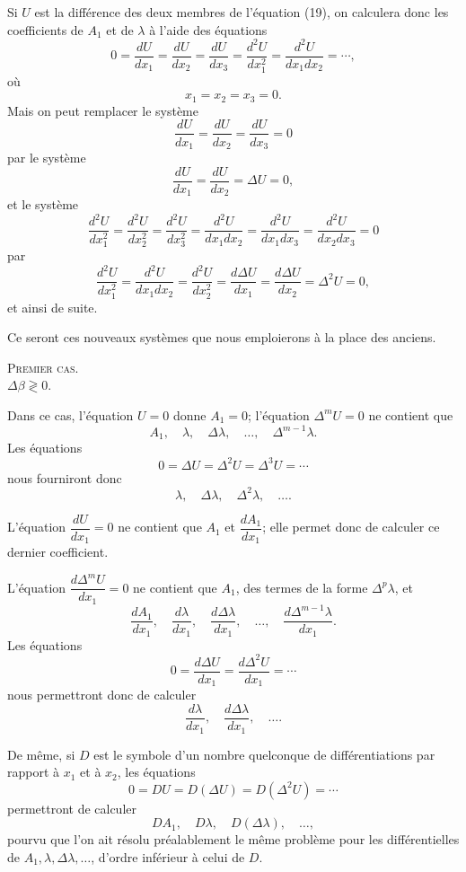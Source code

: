 \documentclass[11pt]{article}
\begin{document}
Si $U$ est la différence des deux membres de l’équation (19), on calculera donc les coefficients de $A_1$ et de $\lambda$ à l’aide des équations
\[
0=\frac{dU}{dx_1}=\frac{dU}{dx_2}=\frac{dU}{dx_3}
=\frac{d^2U}{dx_1^2}
=\frac{d^2U}{dx_1dx_2}
=\cdots,
\]
où
\[
x_1=x_2=x_3=0.
\]
Mais on peut remplacer le système
\[
\frac{dU}{dx_1}=\frac{dU}{dx_2}=\frac{dU}{dx_3}=0
\]
par le système
\[
\frac{dU}{dx_1}=\frac{dU}{dx_2}=\Delta U=0,
\]
et le système
\[
\frac{d^2U}{dx_1^2}
=\frac{d^2U}{dx_2^2}
=\frac{d^2U}{dx_3^2}
=\frac{d^2U}{dx_1dx_2}
=\frac{d^2U}{dx_1dx_3}
=\frac{d^2U}{dx_2dx_3}=0
\]
par
\[
\frac{d^2U}{dx_1^2}
=\frac{d^2U}{dx_1dx_2}
=\frac{d^2U}{dx_2^2}
=\frac{d\Delta U}{dx_1}
=\frac{d\Delta U}{dx_2}
=\Delta^2U=0,
\]
et ainsi de suite.

Ce seront ces nouveaux systèmes que nous emploierons à la place des anciens.

\begin{center}
{\scshape Premier cas.}\\[0.3em]
$\Delta\beta\gtrless0.$
\end{center}

Dans ce cas, l’équation $U=0$ donne $A_1=0$; l’équation $\Delta^mU=0$ ne contient que
\[
A_1,\quad \lambda,\quad \Delta\lambda,\quad \ldots,\quad \Delta^{m-1}\lambda.
\]
Les équations
\[
0=\Delta U=\Delta^2U=\Delta^3U=\cdots
\]
nous fourniront donc
\[
\lambda,\quad \Delta\lambda,\quad \Delta^2\lambda,\quad \ldots.
\]

L’équation $\dfrac{dU}{dx_1}=0$ ne contient que $A_1$ et $\dfrac{dA_1}{dx_1}$; elle permet donc de calculer ce dernier coefficient.

L’équation $\dfrac{d\Delta^mU}{dx_1}=0$ ne contient que $A_1$, des termes de la forme $\Delta^p\lambda$, et
\[
\frac{dA_1}{dx_1},\quad
\frac{d\lambda}{dx_1},\quad
\frac{d\Delta\lambda}{dx_1},\quad
\ldots,\quad
\frac{d\Delta^{m-1}\lambda}{dx_1}.
\]
Les équations
\[
0=\frac{d\Delta U}{dx_1}=\frac{d\Delta^2U}{dx_1}=\cdots
\]
nous permettront donc de calculer
\[
\frac{d\lambda}{dx_1},\quad
\frac{d\Delta\lambda}{dx_1},\quad \ldots.
\]

De même, si $D$ est le symbole d’un nombre quelconque de différentiations par rapport à $x_1$ et à $x_2$, les équations
\[
0=DU=D(\Delta U)=D(\Delta^2U)=\cdots
\]
permettront de calculer
\[
DA_1,\quad D\lambda,\quad D(\Delta\lambda),\quad \ldots,
\]
pourvu que l’on ait résolu préalablement le même problème pour les différentielles de $A_1,\lambda,\Delta\lambda,\ldots$, d’ordre inférieur à celui de $D$.
\end{document}
